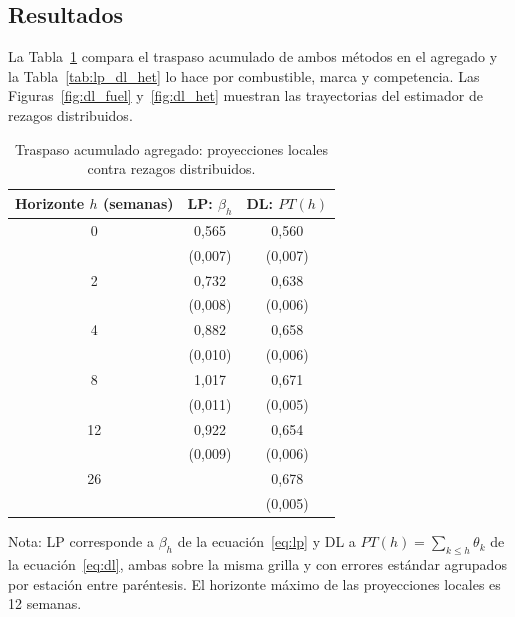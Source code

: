 \documentclass[11pt]{article}
\begin{document}
\subsection{Resultados}
\label{sec:dl_resultados}

La Tabla~\ref{tab:lp_dl} compara el traspaso acumulado de ambos métodos en
el agregado y la Tabla~\ref{tab:lp_dl_het} lo hace por combustible, marca y
competencia. Las Figuras~\ref{fig:dl_fuel} y~\ref{fig:dl_het} muestran las
trayectorias del estimador de rezagos distribuidos.

\begin{table}[htbp]
\centering
\caption{Traspaso acumulado agregado: proyecciones locales contra rezagos
distribuidos.}
\label{tab:lp_dl}
\begin{tabular}{ccc}
\toprule
Horizonte $h$ (semanas) & LP: $\beta_h$ & DL: $PT(h)$ \\
\midrule
0  & 0,565 & 0,560 \\
   & (0,007) & (0,007) \\
2  & 0,732 & 0,638 \\
   & (0,008) & (0,006) \\
4  & 0,882 & 0,658 \\
   & (0,010) & (0,006) \\
8  & 1,017 & 0,671 \\
   & (0,011) & (0,005) \\
12 & 0,922 & 0,654 \\
   & (0,009) & (0,006) \\
26 &       & 0,678 \\
   &       & (0,005) \\
\bottomrule
\end{tabular}

\medskip
\begin{minipage}{0.8\textwidth}
\footnotesize
Nota: LP corresponde a $\beta_h$ de la ecuación~\eqref{eq:lp} y DL a
$PT(h) = \sum_{k \le h} \theta_k$ de la ecuación~\eqref{eq:dl}, ambas sobre
la misma grilla y con errores estándar agrupados por estación entre
paréntesis. El horizonte máximo de las proyecciones locales es 12 semanas.
\end{minipage}
\end{table}
\end{document}
